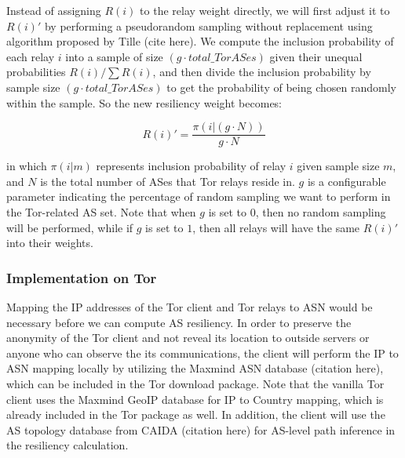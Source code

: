 Instead of assigning $R(i)$ to the relay weight  directly, we will first adjust it to $R(i)\prime$ by performing a pseudorandom sampling without replacement using algorithm proposed by Tille (cite here). We compute the inclusion probability of each relay $i$ into a sample of size $(g \cdot total\_TorASes)$ given their unequal probabilities $R(i)/\sum R(i)$, and then divide the inclusion probability by sample size $(g \cdot total\_TorASes)$ to get the probability of being chosen randomly within the sample. So the new resiliency weight becomes:

\begin{equation*}
R(i) \prime = \frac {\pi(i | (g \cdot N))} {g \cdot N}
\end{equation*}

in which $\pi(i | m)$ represents inclusion probability of relay $i$ given sample size $m$, and $N$ is the total number of ASes that Tor relays reside in. $g$ is a configurable parameter indicating the percentage of random sampling we want to perform in the Tor-related AS set. Note that when $g$ is set to $0$, then no random sampling will be performed, while if $g$ is set to $1$, then all relays will have the same $R(i)\prime$ into their weights.


\subsubsection{Implementation on Tor}
Mapping the IP addresses of the Tor client and Tor relays to ASN would be necessary before we can compute AS resiliency. In order to preserve the anonymity of the Tor client and not reveal its location to outside servers or anyone who can observe the its communications, the client will perform the IP to ASN mapping locally by utilizing the Maxmind ASN database (citation here), which can be included in the Tor download package. Note that the vanilla Tor client uses the Maxmind GeoIP database for IP to Country mapping, which is already included in the Tor package as well. In addition, the client will use the AS topology database from CAIDA (citation here) for AS-level path inference in the resiliency calculation. 

